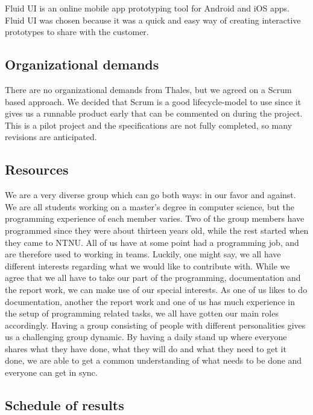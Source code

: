 Fluid UI \cite{bib:fui} is an online mobile app prototyping tool for Android and iOS apps. Fluid UI was chosen because it was a quick 
and easy way of creating interactive prototypes to share with the customer.

\subsection{Organizational demands}
There are no organizational demands from Thales, but we agreed on a Scrum based approach. We decided that Scrum is a good lifecycle-model to use since it gives us a runnable product early that can be commented on during the project. This is a pilot project and the specifications are not fully completed, so many revisions are anticipated.

\newpage

\subsection{Resources}
We are a very diverse group which can go both ways: in our favor and against. We are all students working on a master's degree in computer science, but the programming experience of each member varies. Two of the group members have
programmed since they were about thirteen years old, while the rest started when they came to NTNU. All of us have at some point had a programming job, and are therefore used to working in teams.
\newline
\newline
Luckily, one might say, we all have different interests regarding what we would like to contribute with. While we agree that we all have to take our part of the programming, documentation and the report work, we can make use of our special interests. As one of us likes to do documentation, another the report work and one of us has much experience in the setup of programming related tasks, we all have gotten our main roles accordingly.
\newline
\newline
Having a group consisting of people with different personalities gives us a challenging group dynamic. By having a daily stand up where everyone shares what they have done, what they will do and what they need to get it done, we are able to get a common understanding of what needs to be done and everyone can get in sync.

\subsection{Schedule of results}

